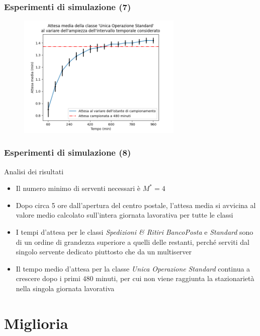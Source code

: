 \documentclass[
	usepdftitle=false,
	xcolor={table, dvipsnames},
	hyperref={
		pdftitle={Studio delle prestazioni di un Ufficio Postale ispirato a Poste Italiane},
    	pdfauthor={A. Chillotti, C. Cuffaro e S. Tiberi}
    }
]{beamer}
\newcommand{\uo}{\textsl{Unica Operazione}}
\newcommand{\sr}{\textsl{Spedizioni \& Ritiri}}
\begin{document}
\begin{frame}
\frametitle{Esperimenti di simulazione (7)}
\begin{figure}[ht]
\centering
\includegraphics[width=0.7\textwidth]{plots/d2-no-stat}
\end{figure}
\end{frame}

\begin{frame}
\frametitle{Esperimenti di simulazione (8)}
\begin{block}{Analisi dei risultati}
\begin{itemize}
\item Il numero minimo di serventi necessari è $M^*=4$
\item Dopo circa 5 ore dall'apertura del centro postale, l'attesa media si avvicina al valore medio calcolato sull'intera giornata lavorativa per tutte le classi
\item I tempi d'attesa per le classi \sr{} \textsl{BancoPosta} e \textsl{Standard} sono di un ordine di grandezza superiore a quelli delle restanti, perché serviti dal singolo servente dedicato piuttosto che da un multiserver
\item Il tempo medio d'attesa per la classe \uo{} \textsl{Standard} continua a crescere dopo i primi $480$ minuti, per cui non viene raggiunta la stazionarietà nella singola giornata lavorativa
\end{itemize}
\end{block}
\end{frame}

\section{Miglioria}
\end{document}
